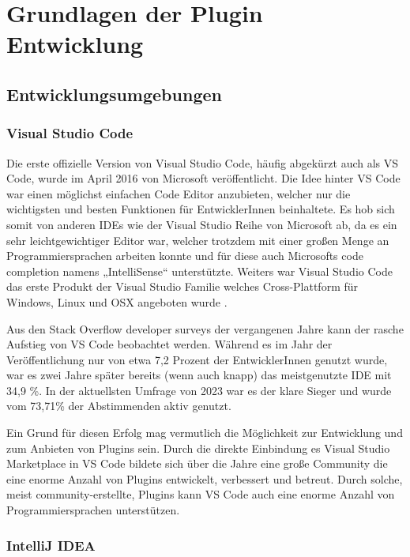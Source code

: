 \chapter{Grundlagen der Plugin Entwicklung}
\label{cha:Grundlagen}

\section{Entwicklungsumgebungen}
\label{sec:Entwicklungsumgebungen}

\subsection{Visual Studio Code}

Die erste offizielle Version von Visual Studio Code, häufig 
abgekürzt auch als VS Code, wurde im April 2016 \cite{VSCodeReleaseDate}
von Microsoft veröffentlicht. Die Idee hinter VS Code
war einen möglichst einfachen Code Editor anzubieten, 
welcher nur die wichtigsten und besten Funktionen für EntwicklerInnen 
beinhaltete. Es hob sich somit von anderen IDEs wie der Visual Studio 
Reihe von Microsoft ab, da es ein sehr leichtgewichtiger Editor war, 
welcher trotzdem mit einer großen Menge an Programmiersprachen arbeiten 
konnte und für diese auch Microsofts code completion namens „IntelliSense“ 
unterstützte. Weiters war Visual Studio Code das erste Produkt der Visual 
Studio Familie welches Cross-Plattform für Windows, Linux und OSX 
angeboten wurde \cite{VSCodePreview}.

Aus den Stack Overflow developer surveys der vergangenen Jahre kann 
der rasche Aufstieg von VS Code beobachtet werden. Während es im 
Jahr der Veröffentlichung nur von etwa 7,2 Prozent der EntwicklerInnen 
genutzt wurde, war es zwei Jahre später bereits (wenn auch knapp) 
das meistgenutzte IDE mit 34,9 \%. In der aktuellsten Umfrage von 
2023 war es der klare Sieger und wurde vom 73,71\% der Abstimmenden 
aktiv genutzt\cite{StackOverflowSurvey,StackOverflowSurvey2023}.

Ein Grund für diesen Erfolg mag vermutlich die Möglichkeit 
zur Entwicklung und zum Anbieten von Plugins sein. Durch die direkte 
Einbindung es Visual Studio Marketplace in VS Code bildete sich über die 
Jahre eine große Community die eine enorme Anzahl von Plugins 
entwickelt, verbessert und betreut. Durch solche, meist 
community-erstellte, Plugins kann VS Code auch eine enorme Anzahl von
Programmiersprachen unterstützen.


\subsection{IntelliJ IDEA}

